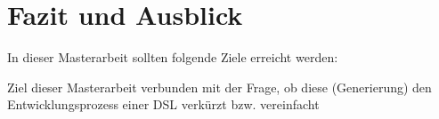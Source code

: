 
\chapter{Fazit und Ausblick}\label{chp:7:fazit}
In dieser Masterarbeit sollten folgende Ziele erreicht werden:

Ziel dieser Masterarbeit 
verbunden mit der Frage, ob diese (Generierung) den Entwicklungsprozess einer DSL verkürzt bzw. vereinfacht